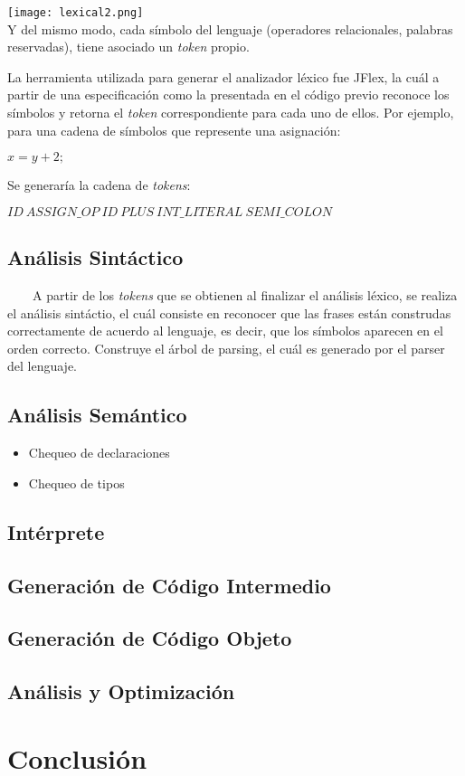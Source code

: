\documentclass[11pt,a4paper]{article}
\begin{document}
\texttt{[image: lexical2.png]} \\ 

Y del mismo modo, cada símbolo del lenguaje (operadores relacionales, palabras reservadas), tiene asociado un \textit{token} propio.

La herramienta utilizada para generar el analizador léxico fue JFlex, la cuál a partir de una especificación como la presentada en el código previo reconoce los símbolos y retorna el \textit{token} correspondiente para cada uno de ellos. Por ejemplo, para una cadena de símbolos que represente una asignación:
\begin{center}
	$x = y+2 ;$
\end{center}
Se generaría la cadena de \textit{tokens}:
\begin{center}
	$ID \ ASSIGN\_OP \ ID \ PLUS \ INT\_LITERAL \ SEMI\_COLON$
\end{center}
 

\subsection{Análisis Sintáctico}
\ \ \ \ A partir de los \textit{tokens} que se obtienen al finalizar el análisis léxico, se realiza el análisis sintáctio, el cuál consiste en reconocer que las frases están construdas correctamente de acuerdo al lenguaje, es decir, que los símbolos aparecen en el orden correcto. Construye el árbol de parsing, el cuál es generado por el parser del lenguaje.
 
\subsection{Análisis Semántico}

\begin{itemize}
\item Chequeo de declaraciones
\item Chequeo de tipos
\end{itemize}

\subsection{Intérprete}

\subsection{Generación de Código Intermedio}

\subsection{Generación de Código Objeto}

\subsection{Análisis y Optimización}

\section{Conclusión}
\end{document}
